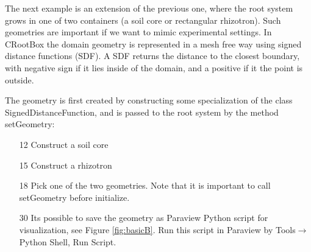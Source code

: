 \documentclass[a4paper]{article}
\begin{document}
The next example is an extension of the previous one, where the root system grows in one of two containers (a soil core or rectangular rhizotron).
Such geometries are important if we want to mimic experimental settings. In CRootBox the domain geometry is represented in a mesh free way using signed distance functions (SDF).
A SDF returns the distance to the closest boundary, with negative sign if it lies inside of the domain, and a positive if it the point is outside.



The geometry is first created by constructing some specialization of the class SignedDistanceFunction, and is passed to the root system by the method setGeometry: 
\begin{itemize}
 \item[12] Construct a soil core 
 \item[15] Construct a rhizotron
 \item[18] Pick one of the two geometries. Note that it is important to call setGeometry before initialize.
 \item[30] Its possible to save the geometry as Paraview Python script for visualization, see Figure \ref{fig:basicB}. Run this script in Paraview by Tools$\rightarrow$Python Shell, Run Script.
\end{itemize}
\end{document}
